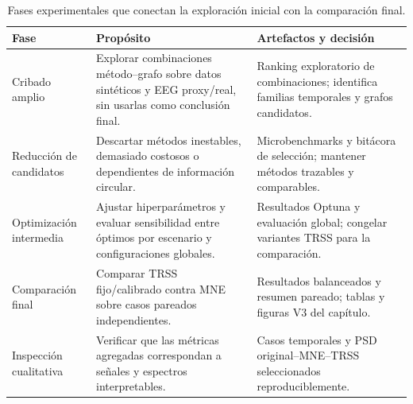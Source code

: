 \begin{table}[H]
\centering
\footnotesize
\setlength{\tabcolsep}{3pt}
\caption{Fases experimentales que conectan la exploración inicial con la comparación final.}
\label{tab:ch4_experimental_phase_overview}
\begin{tabular}{@{}p{2.8cm}p{4.1cm}p{4.6cm}@{}}
\toprule
Fase & Propósito & Artefactos y decisión \\
\midrule
Cribado amplio & Explorar combinaciones método--grafo sobre datos sintéticos y EEG proxy/real, sin usarlas como conclusión final. & Ranking exploratorio de combinaciones; identifica familias temporales y grafos candidatos. \\
Reducción de candidatos & Descartar métodos inestables, demasiado costosos o dependientes de información circular. & Microbenchmarks y bitácora de selección; mantener métodos trazables y comparables. \\
Optimización intermedia & Ajustar hiperparámetros y evaluar sensibilidad entre óptimos por escenario y configuraciones globales. & Resultados Optuna y evaluación global; congelar variantes TRSS para la comparación. \\
Comparación final & Comparar TRSS fijo/calibrado contra MNE sobre casos pareados independientes. & Resultados balanceados y resumen pareado; tablas y figuras V3 del capítulo. \\
Inspección cualitativa & Verificar que las métricas agregadas correspondan a señales y espectros interpretables. & Casos temporales y PSD original--MNE--TRSS seleccionados reproduciblemente. \\
\bottomrule
\end{tabular}
\end{table}
